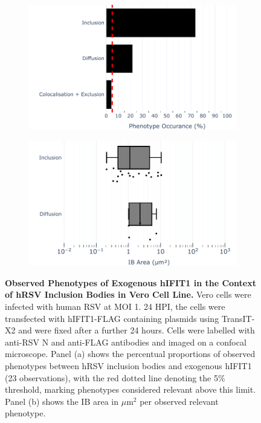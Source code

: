 \begin{figure}
    \begin{subfigure}{0.495\textwidth}
        \caption{}
        \includegraphics[width=1\linewidth]{09. Chapter 4/Figs/02. Overexpression/01. IFIT1/01. bar_i1_hrsv.pdf} 
    \end{subfigure}
    \begin{subfigure}{0.495\textwidth}
        \caption{}
        \includegraphics[width=1\linewidth]{09. Chapter 4/Figs/02. Overexpression/01. IFIT1/02. box_i1_hrsv.pdf}
    \end{subfigure}
    \caption[Observed Phenotypes of Exogenous hIFIT1 in the Context of hRSV Inclusion Bodies in Vero Cell Line.]{\textbf{Observed Phenotypes of Exogenous hIFIT1 in the Context of hRSV Inclusion Bodies in Vero Cell Line.} Vero cells were infected with human RSV at MOI 1. 24 HPI, the cells were transfected with hIFIT1-FLAG containing plasmids using TransIT-X2 and were fixed after a further 24 hours. Cells were labelled with anti-RSV N and anti-FLAG antibodies and imaged on a confocal microscope. Panel (a) shows the percentual proportions of observed phenotypes between hRSV inclusion bodies and exogenous hIFIT1 (23 observations), with the red dotted line denoting the 5\% threshold, marking phenotypes considered relevant above this limit. Panel (b) shows the IB area in \(\mu \mbox{m}^2\) per observed relevant phenotype.}
    \label{fig:Observed Phenotypes of Exogenous hIFIT1 in the Context of hRSV Inclusion Bodies in VERO Cell Line}
\end{figure}

